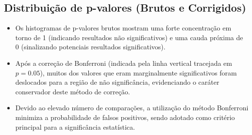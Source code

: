\subsection{Distribuição de p-valores (Brutos e Corrigidos)}

\begin{itemize}
    \item Os histogramas de p-valores brutos mostram uma forte concentração em torno de 1 (indicando resultados não significativos) e uma cauda próxima de 0 (sinalizando potenciais resultados significativos).
    \item Após a correção de Bonferroni (indicada pela linha vertical tracejada em \(p=0.05\)), muitos dos valores que eram marginalmente significativos foram deslocados para a região de não significância, evidenciando o caráter conservador deste método de correção.
    \item Devido ao elevado número de comparações, a utilização do método Bonferroni minimiza a probabilidade de falsos positivos, sendo adotado como critério principal para a significância estatística.
\end{itemize}


